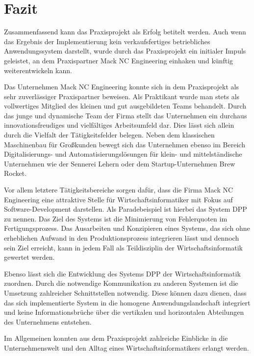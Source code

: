 \documentclass[
    type=Prakikumsbericht,
    status=draft, %
    language=german, %
    bibengine=bibtex,
]{unibwm-inf-thesis}
\begin{document}
   \chapter{Fazit}
    Zusammenfassend kann das Praxisprojekt als Erfolg betitelt werden.
    Auch wenn das Ergebnis der Implementierung kein verkaufsfertiges betriebliches Anwendungssystem darstellt, wurde durch das Praxisprojekt ein
    initialer Impuls geleistet, an dem Praxispartner Mack NC Engineering einhaken und künftig weiterentwickeln kann.

    Das Unternehmen Mack NC Engineering konnte sich in dem Praxisprojekt als sehr zuverlässiger Praxispartner beweisen.
    Als Praktikant wurde man stets als vollwertiges Mitglied des kleinen und gut ausgebildeten Teams behandelt.
    Durch das junge und dynamische Team der Firma stellt das Unternehmen ein durchaus innovationsfreudiges und vielfältiges Arbeitsumfeld dar.
    Dies lässt sich allein durch die Vielfalt der Tätigkeitsfelder belegen.
    Neben dem klassischen Maschinenbau für Großkunden bewegt sich das Unternehmen ebenso im Bereich Digitalisierungs- und Automatisierungslösungen für klein- und mittelständische
    Unternehmen wie der Sennerei Lehern oder dem Startup-Unternehmen Brew Rocket.

    Vor allem letztere Tätigkeitsbereiche sorgen dafür, dass die Firma Mack NC Engineering eine attraktive Stelle für Wirtschaftsinformatiker mit Fokus auf Software-Development darstellen.
    Als Paradebeispiel ist hierbei das System \ac{DPP} zu nennen.
    Das Ziel des Systems ist die Minimierung von Fehlerquoten im Fertigungsprozess.
    Das Ausarbeiten und Konzipieren eines Systems, das sich ohne erheblichen Aufwand in den Produktionsprozess integrieren lässt und dennoch sein Ziel erreicht, kann in jedem Fall als Teildisziplin der Wirtschaftsinformatik gewertet werden.

    Ebenso lässt sich die Entwicklung des Systems \ac{DPP} der Wirtschaftsinformatik zuordnen.
    Durch die notwendige Kommunikation zu anderen Systemen ist die Umsetzung zahlreicher Schnittstellen notwendig.
    Diese können dazu dienen, dass das sich implementierte System in die homogene Anwendungslandschaft integriert und keine Informationsbrüche über die vertikalen und horizontalen Abteilungen des Unternehmens entstehen.

    Im Allgemeinen konnten aus dem Praxisprojekt zahlreiche Einblicke in die Unternehmenswelt und den Alltag eines Wirtschaftsinformatikers erlangt werden.

    
    \backmatter
    
    
\end{document}
